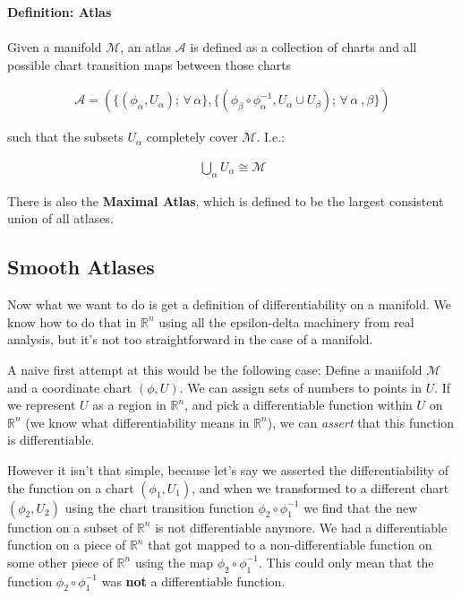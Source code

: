 \documentclass[10pt]{article}
\begin{document}
\begin{tcolorbox}
\textbf{Definition: Atlas} \\ \\ 
Given a manifold $\mathcal{M}$, an atlas $\mathcal{A}$ is defined as a collection of charts and all possible chart transition maps between those charts

\begin{align*}
    \mathcal{A} = (\{(\phi_{\alpha}, U_{\alpha}) ;\, \forall\, \alpha\} , \{(\phi_{\beta}\circ\phi_{\alpha}^{-1}, U_{\alpha}\cup U_{\beta}) ;\, \forall\, \alpha\ , \beta\} )
\end{align*}

such that the subsets $U_{\alpha}$ completely cover $\mathcal{M}$. I.e.:

\begin{align*}
    \bigcup_{\alpha} U_{\alpha} \cong \mathcal{M}
\end{align*}

There is also the \textbf{Maximal Atlas}, which is defined to be the largest consistent union of all atlases. 

\end{tcolorbox}

\subsection{Smooth Atlases}
Now what we want to do is get a definition of differentiability on a manifold. We know how to do that in $\mathbb{R}^n$ using all the epsilon-delta machinery from real analysis, but it's not too straightforward in the case of a manifold. 

A naive first attempt at this would be the following case: 
Define a manifold $\mathcal{M}$ and a coordinate chart $(\phi,U)$. We can assign sets of numbers to points in $U$. If we represent $U$ as a region in $\mathbb{R}^n$, and pick a differentiable function within $U$ on $\mathbb{R}^n$  (we know what differentiability means in $\mathbb{R}^n$), we can \textit{assert} that this function is differentiable. 

However it isn't that simple, because let's say we asserted the differentiability of the function on a chart $(\phi_1,U_1)$, and when we transformed to a different chart $(\phi_2,U_2)$ using the chart transition function $\phi_2\circ\phi_1^{-1}$ we find that the new function on a subset of $\mathbb{R}^n$ is not differentiable anymore. We had a differentiable function on a piece of $\mathbb{R}^n$ that got mapped to a non-differentiable function on some other piece of $\mathbb{R}^n$ using the map  $\phi_2\circ\phi_1^{-1}$. This could only mean that the function $\phi_2\circ\phi_1^{-1}$ was \textbf{not} a differentiable function. 
\end{document}
